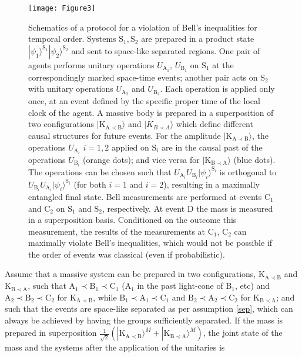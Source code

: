 \documentclass[a4paper,11pt]{article}
\newcommand{\ket}{\rangle}
\begin{document}
\begin{figure}[ht!]
\centering
\texttt{[image: Figure3]}
\caption{Schematics of a protocol for a violation of Bell's inequalities for temporal order. Systems $\mathrm{S_1, S_2}$ are prepared in a product state $|\psi_1\ket^\mathrm{S_1}|\psi_2\ket^\mathrm{S_2}$ and sent to space-like separated regions. One pair of agents performs unitary operations $U_\mathrm{A_1}$, $U_\mathrm{B_1}$ on $\mathrm S_1$ at the correspondingly marked space-time events; another pair acts on $\mathrm S_2$ with unitary operations $U_\mathrm{A_2}$ and $U_\mathrm{B_2}$. Each operation is applied only once, at an event defined by the specific proper time of the local clock of the agent. A massive body is prepared in a superposition of two configurations $|\mathrm{K_{A\prec B}}\ket$ and $|K_{B\prec A}\ket$ which define different causal structures for future events. For the amplitude $|\mathrm{K_{A\prec B}}\ket$, the operations  $U_{\mathrm{A}_i}$ $i=1,2$ applied on $\mathrm S_i$ are in the causal past of the operations $U_{\mathrm{B}_i}$ (orange dots); and vice versa for $|\mathrm{K_{B\prec A}}\ket$ (blue dots). The operations can be chosen such that $U_{\mathrm{A}_i}U_{\mathrm{B}_i}|\psi_i\ket^{\mathrm S_i}$ is orthogonal to $U_{\mathrm{B}_i}U_{\mathrm{A}_i}|\psi_i\ket^{\mathrm{S}_i}$ (for both $i=1$ and $i=2$), resulting in a maximally entangled final state.  Bell measurements are performed at events $\mathrm C_1$ and $\mathrm C_2$ on $\mathrm S_1$ and $\mathrm S_2$, respectively.  At event $\mathrm D$  the mass is measured in a superposition basis. Conditioned on the outcome this measurement,  the results of the measurements at $\mathrm C_1$, $\mathrm C_2$ can maximally violate Bell's inequalities, which would not be possible if the order of events was classical (even if probabilistic).\hspace*{\fill}}
\label{bell_for_time}
\end{figure}
%
Assume that a massive system can be prepared in two configurations, $\mathrm{K_{A\prec B}}$ and $\mathrm{K_{B\prec A}}$, such that $\mathrm{A_1 \prec B_1 \prec C_1}$ ($\mathrm{ A_1}$ in the past light-cone of B$_1$, etc) and $\mathrm{A_2 \prec B_2 \prec C_2}$ for $\mathrm{K_{A\prec B}}$, while $\mathrm{B_1 \prec A_1 \prec C_1}$ and $\mathrm{B_2 \prec A_2 \prec C_2}$ for $\mathrm{K_{B\prec A}}$; and such that the events are space-like separated as per assumption \ref{sep}, which can always be achieved by having the groups sufficiently separated. If the mass is prepared in superposition $\frac{1}{\sqrt{2}}\left(|\mathrm{K_{A\prec B}}\ket^{M} + |\mathrm{K_{B\prec A}}\ket^{M}\right)$, the joint  state of the mass and the systems after the application of the unitaries is
\end{document}
